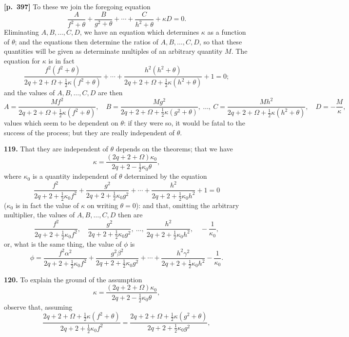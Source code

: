 \documentclass[11pt,a4paper]{article}
\begin{document}
\noindent\textbf{[p.~397]}\quad
To these we join the foregoing equation
\[
\frac{A}{f^{2}+\theta} + \frac{B}{g^{2}+\theta} + \cdots + \frac{C}{h^{2}+\theta} + \kappa D = 0.
\]
Eliminating $A, B, \ldots, C, D$, we have an equation which determines $\kappa$ as a function of $\theta$; and the equations then determine the ratios of $A, B, \ldots, C, D$, so that these quantities will be given as determinate multiples of an arbitrary quantity $M$. The equation for $\kappa$ is in fact
\[
\frac{f^{2}(f^{2}+\theta)}{2q + 2 + \Omega + \tfrac{1}{2}\kappa(f^{2}+\theta)} + \cdots + \frac{h^{2}(h^{2}+\theta)}{2q + 2 + \Omega + \tfrac{1}{2}\kappa(h^{2}+\theta)} + 1 = 0;
\]
and the values of $A, B, \ldots, C, D$ are then
\[
A = \frac{M f^{2}}{2q + 2 + \Omega + \tfrac{1}{2}\kappa(f^{2}+\theta)},\quad
B = \frac{M g^{2}}{2q + 2 + \Omega + \tfrac{1}{2}\kappa(g^{2}+\theta)},\ \ldots,\
C = \frac{M h^{2}}{2q + 2 + \Omega + \tfrac{1}{2}\kappa(h^{2}+\theta)},\quad
D = -\frac{M}{\kappa},
\]
values which seem to be dependent on $\theta$: if they were so, it would be fatal to the success of the process; but they are really independent of $\theta$.

\textbf{119.} That they are independent of $\theta$ depends on the theorems; that we have
\[
\kappa = \frac{(2q + 2 + \Omega)\kappa_{0}}{2q + 2 - \tfrac{1}{2}\kappa_{0}\theta},
\]
where $\kappa_{0}$ is a quantity independent of $\theta$ determined by the equation
\[
\frac{f^{2}}{2q + 2 + \tfrac{1}{2}\kappa_{0} f^{2}} + \frac{g^{2}}{2q + 2 + \tfrac{1}{2}\kappa_{0} g^{2}} + \cdots + \frac{h^{2}}{2q + 2 + \tfrac{1}{2}\kappa_{0} h^{2}} + 1 = 0
\]
($\kappa_{0}$ is in fact the value of $\kappa$ on writing $\theta = 0$): and that, omitting the arbitrary multiplier, the values of $A, B, \ldots, C, D$ then are
\[
\frac{f^{2}}{2q + 2 + \tfrac{1}{2}\kappa_{0} f^{2}},\quad \frac{g^{2}}{2q + 2 + \tfrac{1}{2}\kappa_{0} g^{2}},\ \ldots,\ \frac{h^{2}}{2q + 2 + \tfrac{1}{2}\kappa_{0} h^{2}},\quad -\frac{1}{\kappa_{0}},
\]
or, what is the same thing, the value of $\phi$ is
\[
\phi = \frac{f^{2}\alpha^{2}}{2q + 2 + \tfrac{1}{2}\kappa_{0} f^{2}} + \frac{g^{2}\beta^{2}}{2q + 2 + \tfrac{1}{2}\kappa_{0} g^{2}} + \cdots + \frac{h^{2}\gamma^{2}}{2q + 2 + \tfrac{1}{2}\kappa_{0} h^{2}} - \frac{1}{\kappa_{0}}.
\]

\textbf{120.} To explain the ground of the assumption
\[
\kappa = \frac{(2q + 2 + \Omega)\kappa_{0}}{2q + 2 - \tfrac{1}{2}\kappa_{0}\theta},
\]
observe that, assuming
\[
\frac{2q + 2 + \Omega + \tfrac{1}{2}\kappa(f^{2}+\theta)}{2q + 2 + \tfrac{1}{2}\kappa_{0} f^{2}} = \frac{2q + 2 + \Omega + \tfrac{1}{2}\kappa(g^{2}+\theta)}{2q + 2 + \tfrac{1}{2}\kappa_{0} g^{2}},
\]
\end{document}
